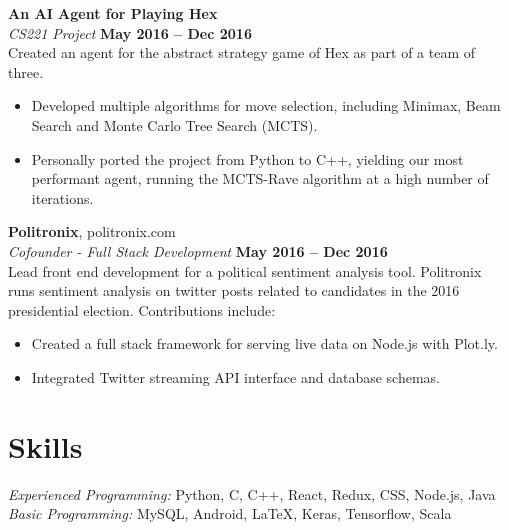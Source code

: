 \documentclass[margin,line]{resume}
\begin{document}
\begin{resume}
   \textbf{An AI Agent for Playing Hex} \vspace{2mm}\\\vspace{1mm}%
    \textsl{CS221 Project} \hfill \textbf{May 2016 -- Dec 2016}\\
    Created an agent for the abstract strategy game of Hex as part of a team of three.
    \begin{itemize}
    	\item Developed multiple algorithms for move selection, including Minimax, Beam Search and Monte Carlo Tree Search (MCTS).
        \item Personally ported the project from Python to C++, yielding our most performant agent, running the MCTS-Rave algorithm at a high number of iterations.
    \end{itemize}
    
    \textbf{Politronix}, politronix.com \vspace{2mm}\\\vspace{1mm}%
    \textsl{Cofounder - Full Stack Development} \hfill \textbf{May 2016 -- Dec 2016}\\
    Lead front end development for a political sentiment analysis tool. Politronix runs sentiment analysis on twitter posts related to candidates in the 2016 presidential election. Contributions include:
    \begin{itemize}
        \item Created a full stack framework for serving live data on Node.js with Plot.ly.
        \item Integrated Twitter streaming API interface and database schemas.
    \end{itemize}

    \section{\mysidestyle Skills}

    \emph{Experienced Programming:} Python, C, C++, React, Redux, CSS, Node.js, Java \\
    \emph{Basic Programming:} MySQL, Android, \LaTeX, Keras, Tensorflow, Scala
\end{resume}
\end{document}

